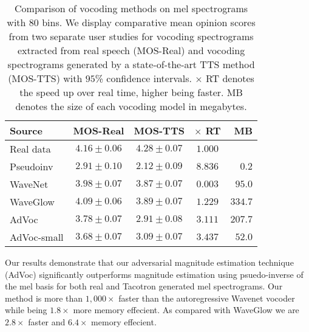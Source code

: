 \documentclass[a4paper]{article}
\begin{document}
\begin{table}[t]
\centering
\caption{Comparison of vocoding methods on mel spectrograms with $80$ bins. We display comparative mean opinion scores from two separate user studies for vocoding spectrograms extracted from real speech (MOS-Real) and vocoding spectrograms generated by a state-of-the-art TTS method (MOS-TTS) with $95$\% confidence intervals. $\mathbf{\times}$ RT denotes the speed up over real time, higher being faster. MB denotes the size of each vocoding model in megabytes.
}
\footnotesize
\begin{tabular}{lcccr}
\toprule
Source & MOS-Real & MOS-TTS & $\times$ RT & MB \\
\midrule
Real data & $4.16 \pm 0.06$& $4.28 \pm 0.07$  & $1.000$ &   \\
Pseudoinv & $2.91 \pm 0.10$ & $2.12 \pm 0.09$ & $8.836$ & $0.2$ \\
WaveNet \cite{oord2016wavenet} & $3.98 \pm 0.07$ & $3.87 \pm 0.07$ & $0.003$ & $95.0$ \\
WaveGlow \cite{waveglow} & $4.09 \pm 0.06$ & $3.89 \pm 0.07$ & $1.229$ & $334.7$ \\
AdVoc & $3.78 \pm 0.07$ & $2.91 \pm 0.08$ & $3.111$ & $207.7$ \\
AdVoc-small & $3.68 \pm 0.07$ & $3.09 \pm 0.07$ & $3.437$ & $52.0$ \\
\bottomrule
\end{tabular}
\label{tab:realMOS}

\end{table}

Our results demonstrate that our adversarial magnitude estimation technique (AdVoc) significantly outperforms magnitude estimation using psuedo-inverse of the mel basis for both real and 
Tacotron generated mel spectrograms. Our method is more than $1,000 \times$ faster than the autoregressive Wavenet vocoder while being $1.8 \times$ more memory effecient. As compared with WaveGlow we are $2.8 \times$ faster and $6.4 \times$ memory effecient. 
\end{document}
